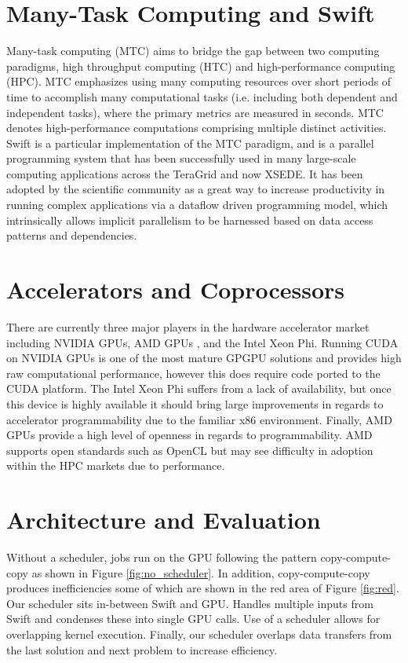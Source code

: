 \documentclass[conference]{IEEEtran}
\begin{document}
\section{Many-Task Computing and Swift}
Many-task computing (MTC) aims to bridge the gap between two computing paradigms, high throughput computing (HTC) and high-performance computing (HPC). MTC emphasizes using many computing resources over short periods of time to accomplish many computational tasks (i.e. including both dependent and independent tasks), where the primary metrics are measured in seconds. MTC denotes high-performance computations comprising multiple distinct activities. Swift is a particular implementation of the MTC paradigm, and is a parallel programming system that has been successfully used in many large-scale computing applications across the TeraGrid and now XSEDE. It has been adopted by the scientific community as a great way to increase productivity in running complex applications via a dataflow driven programming model, which intrinsically allows implicit parallelism to be harnessed based on data access patterns and dependencies.

\section{Accelerators and Coprocessors}
There are currently three major players in the hardware accelerator market including NVIDIA GPUs, AMD GPUs \cite{AMD_web}, and the Intel Xeon Phi. Running CUDA on NVIDIA GPUs is one of the most mature GPGPU solutions and provides high raw computational performance, however this does require code ported to the CUDA platform. The Intel Xeon Phi suffers from a lack of availability, but once this device is highly available it should bring large improvements in regards to accelerator programmability due to the familiar x86 environment. Finally, AMD GPUs provide a high level of openness in regards to programmability. AMD supports open standards such as OpenCL but may see difficulty in adoption within the HPC markets due to performance.\cite{kriederGCASR12}

\section{Architecture and Evaluation}
Without a scheduler, jobs run on the GPU following the pattern copy-compute-copy as shown in Figure \ref{fig:no_scheduler}. In addition, copy-compute-copy produces inefficiencies some of which are shown in the red area of Figure \ref{fig:red}. Our scheduler sits in-between Swift and GPU. Handles multiple inputs from Swift and condenses these into single GPU calls. Use of a scheduler allows for overlapping kernel execution. Finally, our scheduler overlaps data transfers from the last solution and next problem to increase efficiency.
\end{document}
